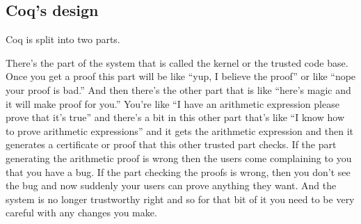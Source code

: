 \begin{subappendices}
\begin{comment}
Coq and proof assistance are important. Performance in them is important, especially at scale. Performance engineering in proof assistants has some unique challenges that don't show up in other programming languages.

And I want to paint a picture of what the unique challenges are.  There are two main areas in the existing system that I want to call attention to, in regards to performance bottlenecks.  I will describe them, and describe the performance issues, and propose some reasons about why there might be performance bottlenecks, and describe solutions for them. And maybe also there'll be another section that has some miscellaneous other performance bottlenecks.
\end{comment}

\section{Coq's design}
Coq is split into two parts.

There's the part of the system that is called the kernel or the trusted code base.
Once you get a proof this part will be like ``yup, I believe the proof'' or like ``nope your proof is bad.''
And then there's the other part that is like ``here's magic and it will make proof for you.''
You're like ``I have an arithmetic expression please prove that it's true'' and there's a bit in this other part that's like ``I know how to prove arithmetic expressions'' and it gets the arithmetic expression and then it generates a certificate or proof that this other trusted part checks.
If the part generating the arithmetic proof is wrong then the users come complaining to you that you have a bug.
If the part checking the proofs is wrong, then you don't see the bug and now suddenly your users can prove anything they want.
And the system is no longer trustworthy right and so for that bit of it you need to be very careful with any changes you make.
\end{subappendices}

